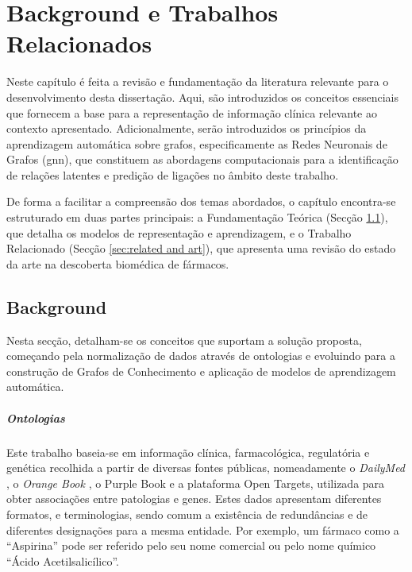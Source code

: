 % 
%  
%
\chapter{Background e Trabalhos Relacionados}
\label{cha:background e trabalhos relacionados}
Neste capítulo é feita a revisão e fundamentação da literatura relevante para o desenvolvimento desta dissertação. Aqui, são introduzidos os conceitos essenciais que fornecem a base para a representação de informação clínica relevante ao contexto apresentado. Adicionalmente, serão introduzidos os princípios da aprendizagem automática sobre grafos, especificamente as Redes Neuronais de Grafos (\acrfull{gnn}), que constituem as abordagens computacionais para a identificação de relações latentes e predição de ligações no âmbito deste trabalho.

De forma a facilitar a compreensão dos temas abordados, o capítulo encontra-se estruturado em duas partes principais: a Fundamentação Teórica (Secção \ref{sec:background}), que detalha os modelos de representação e aprendizagem, e o Trabalho Relacionado (Secção \ref{sec:related and art}),  que apresenta uma revisão do estado da arte na descoberta biomédica de fármacos.

\section{Background}
\label{sec:background}
Nesta secção, detalham-se os conceitos que suportam a solução proposta, começando pela normalização de dados através de ontologias e evoluindo para a construção de Grafos de Conhecimento e aplicação de modelos de aprendizagem automática.
\paragraph{Ontologias}
\label{subsec:ontologias}
Este trabalho baseia-se em informação clínica, farmacológica, regulatória e genética recolhida a partir de diversas fontes públicas, nomeadamente o \emph{DailyMed} \cite{dailymed}, o \emph{Orange Book} \cite{orangebook}, o Purple Book \cite{purplebook} e a plataforma Open Targets, utilizada para obter associações entre patologias e genes. Estes dados apresentam diferentes formatos, e terminologias, sendo comum a existência de redundâncias e de diferentes designações para a mesma entidade. Por exemplo, um fármaco como a \enquote{Aspirina} pode ser referido pelo seu nome comercial ou pelo nome químico \enquote{Ácido Acetilsalicílico}.

